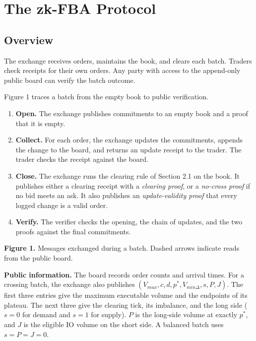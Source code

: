 
\section{The zk-FBA Protocol}

\subsection{Overview}

The exchange receives orders, maintains the book, and clears each batch. Traders check receipts for their own orders. Any party with access to the append-only public board can verify the batch outcome.

Figure 1 traces a batch from the empty book to public verification.

\begin{enumerate}
\def\labelenumi{\arabic{enumi}.}
\item
  \textbf{Open.} The exchange publishes commitments to an empty book and a proof that it is empty.
\item
  \textbf{Collect.} For each order, the exchange updates the commitments, appends the change to the board, and returns an update receipt to the trader. The trader checks the receipt against the board.
\item
  \textbf{Close.} The exchange runs the clearing rule of Section 2.1 on the book. It publishes either a clearing receipt with a \emph{clearing proof}, or a \emph{no-cross proof} if no bid meets an ask. It also publishes an \emph{update-validity proof} that every logged change is a valid order.
\item
  \textbf{Verify.} The verifier checks the opening, the chain of updates, and the two proofs against the final commitments.
\end{enumerate}

\textbf{Figure 1.} Messages exchanged during a batch. Dashed arrows indicate reads from the public board.

\textbf{Public information.} The board records order counts and arrival times. For a crossing batch, the exchange also publishes \((V_{max},c,d,p^*,V_{min\Delta},s,P,J)\). The first three entries give the maximum executable volume and the endpoints of its plateau. The next three give the clearing tick, its imbalance, and the long side (\(s=0\) for demand and \(s=1\) for supply). \(P\) is the long-side volume at exactly \(p^*\), and \(J\) is the eligible IO volume on the short side. A balanced batch uses \(s=P=J=0\).

